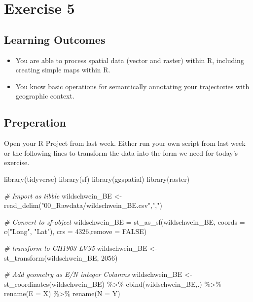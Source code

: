 \documentclass[
]{book}
\newenvironment{Shaded}{\begin{snugshade}}{\end{snugshade}}
\newcommand{\AttributeTok}[1]{\textcolor[rgb]{0.77,0.63,0.00}{#1}}
\newcommand{\CommentTok}[1]{\textcolor[rgb]{0.56,0.35,0.01}{\textit{#1}}}
\newcommand{\ConstantTok}[1]{\textcolor[rgb]{0.00,0.00,0.00}{#1}}
\newcommand{\DecValTok}[1]{\textcolor[rgb]{0.00,0.00,0.81}{#1}}
\newcommand{\FunctionTok}[1]{\textcolor[rgb]{0.00,0.00,0.00}{#1}}
\newcommand{\NormalTok}[1]{#1}
\newcommand{\OtherTok}[1]{\textcolor[rgb]{0.56,0.35,0.01}{#1}}
\newcommand{\SpecialCharTok}[1]{\textcolor[rgb]{0.00,0.00,0.00}{#1}}
\newcommand{\StringTok}[1]{\textcolor[rgb]{0.31,0.60,0.02}{#1}}
\providecommand{\tightlist}{%
  \setlength{\itemsep}{0pt}\setlength{\parskip}{0pt}}
\begin{document}
\hypertarget{exercise-5}{%
\chapter{Exercise 5}\label{exercise-5}}

\hypertarget{learning-outcomes-4}{%
\section{Learning Outcomes}\label{learning-outcomes-4}}

\begin{itemize}
\tightlist
\item
  You are able to process spatial data (vector and raster) within R, including creating simple maps within R.
\item
  You know basic operations for semantically annotating your trajectories with geographic context.
\end{itemize}

\hypertarget{preperation-3}{%
\section{Preperation}\label{preperation-3}}

Open your R Project from last week. Either run your own script from last week or the following lines to transform the data into the form we need for today's exercise.

\begin{Shaded}
\begin{Highlighting}[]
\FunctionTok{library}\NormalTok{(tidyverse)}
\FunctionTok{library}\NormalTok{(sf)}
\FunctionTok{library}\NormalTok{(ggspatial)}
\FunctionTok{library}\NormalTok{(raster)}

\CommentTok{\# Import as tibble}
\NormalTok{wildschwein\_BE }\OtherTok{\textless{}{-}} \FunctionTok{read\_delim}\NormalTok{(}\StringTok{"00\_Rawdata/wildschwein\_BE.csv"}\NormalTok{,}\StringTok{","}\NormalTok{)}


\CommentTok{\# Convert to sf{-}object}
\NormalTok{wildschwein\_BE }\OtherTok{=} \FunctionTok{st\_as\_sf}\NormalTok{(wildschwein\_BE, }\AttributeTok{coords =} \FunctionTok{c}\NormalTok{(}\StringTok{"Long"}\NormalTok{, }\StringTok{"Lat"}\NormalTok{), }\AttributeTok{crs =} \DecValTok{4326}\NormalTok{,}\AttributeTok{remove =} \ConstantTok{FALSE}\NormalTok{)}

\CommentTok{\# transform to CH1903 LV95}
\NormalTok{wildschwein\_BE }\OtherTok{\textless{}{-}} \FunctionTok{st\_transform}\NormalTok{(wildschwein\_BE, }\DecValTok{2056}\NormalTok{)}

\CommentTok{\# Add geometry as E/N integer Columns}
\NormalTok{wildschwein\_BE }\OtherTok{\textless{}{-}} \FunctionTok{st\_coordinates}\NormalTok{(wildschwein\_BE) }\SpecialCharTok{\%\textgreater{}\%}
  \FunctionTok{cbind}\NormalTok{(wildschwein\_BE,.) }\SpecialCharTok{\%\textgreater{}\%}
  \FunctionTok{rename}\NormalTok{(}\AttributeTok{E =}\NormalTok{ X) }\SpecialCharTok{\%\textgreater{}\%}
  \FunctionTok{rename}\NormalTok{(}\AttributeTok{N =}\NormalTok{ Y)}
\end{Highlighting}
\end{Shaded}
\end{document}
